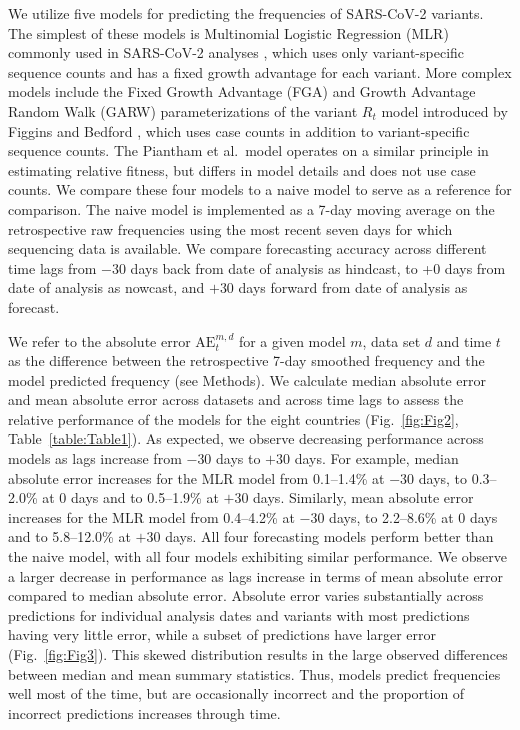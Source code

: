 \documentclass[10pt,letterpaper]{article}
\begin{document}
We utilize five models for predicting the frequencies of SARS-CoV-2 variants.
The simplest of these models is Multinomial Logistic Regression (MLR) commonly used in SARS-CoV-2 analyses \cite{annavajhala2021emergence, faria2021genomics, obermeyer2022analysis, susswein2023early}, which uses only variant-specific sequence counts and has a fixed growth advantage for each variant.
More complex models include the Fixed Growth Advantage (FGA) and Growth Advantage Random Walk (GARW) parameterizations of the variant $R_t$ model introduced by Figgins and Bedford \cite{figgins2022sars}, which uses case counts in addition to variant-specific sequence counts.
The Piantham et al.\ model \cite{piantham2021estimating} operates on a similar principle in estimating relative fitness, but differs in model details and does not use case counts.
We compare these four models to a naive model to serve as a reference for comparison.
The naive model is implemented as a 7-day moving average on the retrospective raw frequencies using the most recent seven days for which sequencing data is available.
We compare forecasting accuracy across different time lags from $-30$ days back from date of analysis as hindcast, to +0 days from date of analysis as nowcast, and $+30$ days forward from date of analysis as forecast.


We refer to the absolute error $\mathrm{AE}_{t}^{m,d}$ for a given model $m$, data set $d$ and time $t$ as the difference between the retrospective 7-day smoothed frequency and the model predicted frequency (see Methods).
We calculate median absolute error and mean absolute error across datasets and across time lags to assess the relative performance of the models for the eight countries (Fig.~\ref{fig:Fig2}, Table~\ref{table:Table1}).
As expected, we observe decreasing performance across models as lags increase from $-30$ days to $+30$ days.
For example, median absolute error increases for the MLR model from 0.1--1.4\% at $-30$ days, to 0.3--2.0\% at 0 days and to 0.5--1.9\% at $+30$ days.
Similarly, mean absolute error increases for the MLR model from 0.4--4.2\% at $-30$ days, to 2.2--8.6\% at 0 days and to 5.8--12.0\% at $+30$ days.
All four forecasting models perform better than the naive model, with all four models exhibiting similar performance.
We observe a larger decrease in performance as lags increase in terms of mean absolute error compared to median absolute error.
Absolute error varies substantially across predictions for individual analysis dates and variants with most predictions having very little error, while a subset of predictions have larger error (Fig.~\ref{fig:Fig3}).
This skewed distribution results in the large observed differences between median and mean summary statistics.
Thus, models predict frequencies well most of the time, but are occasionally incorrect and the proportion of incorrect predictions increases through time.
\end{document}
